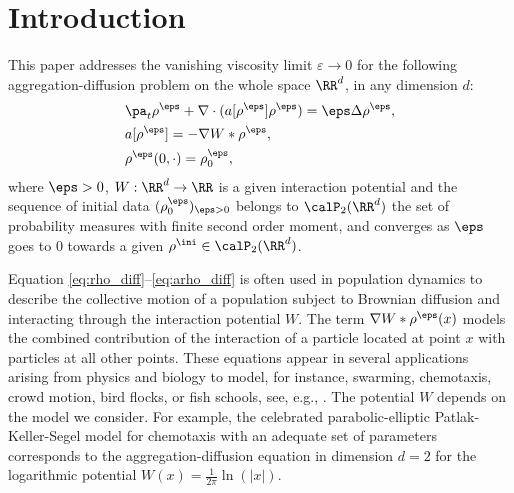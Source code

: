 \section{Introduction}

This paper addresses the vanishing viscosity limit $\varepsilon \to 0$ for the following aggregation-diffusion problem on the whole space $\RR^d$, in any dimension $d$:
\begin{subequations}\label{eq:agg_diff}
\begin{align}
& \pa_t \rho^\eps + \nabla \cdot (a[\rho^\eps] \rho^\eps) = \eps \Delta \rho^\eps, \label{eq:rho_diff} \\
& a[\rho^\eps] = - \nabla W * \rho^\eps, \label{eq:arho_diff} \\
& \rho^\eps(0, \cdot) = \rho_0^\eps, \label{eq:rho0_diff}
\end{align}
\end{subequations}
where $\eps > 0$, $W : \RR^d \to \RR$ is a given interaction potential and the sequence of initial data $(\rho_0^\eps)_{\eps>0}$ belongs to $\calP_2(\RR^d)$ the set of probability measures with finite second order moment, and converges as $\eps$ goes to 0 towards a given $\rho^{\ini} \in \calP_2(\RR^d)$.

Equation \eqref{eq:rho_diff}--\eqref{eq:arho_diff} is often used in population dynamics to describe the collective motion of a population subject to Brownian diffusion and interacting through the interaction potential $W$. The term $\nabla W * \rho^\eps(x)$ models the combined contribution of the interaction of a particle located at point $x$ with particles at all other points. These equations appear in several applications arising from physics and biology to model, for instance, swarming, chemotaxis, crowd motion, bird flocks, or fish schools, see, e.g., \cite{morale05, burger07,topaz06,topaz04,dolak05,JVChemotaxis}. The potential $W$ depends on the model we consider. For example, the celebrated parabolic-elliptic Patlak-Keller-Segel model \cite{keller71, keller71traveling} for chemotaxis with an adequate set of parameters corresponds to the aggregation-diffusion equation in dimension $d=2$ for the logarithmic potential $W(x) = \frac{1}{2\pi} \ln(|x|)$.

